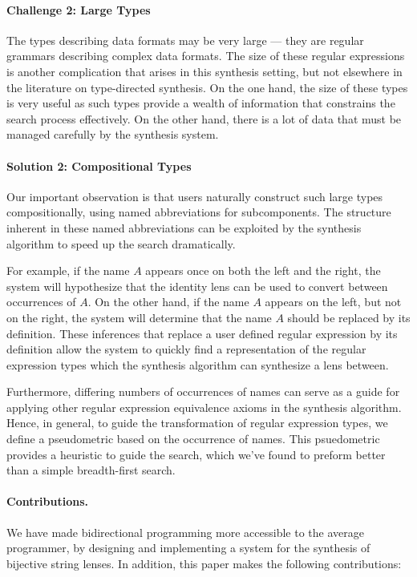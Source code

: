 \documentclass[numbers,10pt,preprint\ifanon ,nocopyrightspace\fi]{sigplanconf}
\begin{document}
\paragraph*{Challenge 2: Large Types}
The types
describing data formats may be very large --- they are regular
grammars describing complex data formats.  The size of these regular expressions
is another complication that
arises in this synthesis setting, but not elsewhere in the literature on
type-directed synthesis.  On the one hand, the size of these types is
very useful as such types provide a wealth of information that constrains
the search process effectively.  On the other hand, there is a lot of
data that must be managed carefully by the synthesis system.

\paragraph*{Solution 2: Compositional Types}
Our important observation is that users naturally construct such large types
compositionally, using named abbreviations for subcomponents.
The structure inherent in these named abbreviations can be
exploited by the synthesis algorithm to speed up the search dramatically.

For example, if the name $A$ appears once on both the left and the right,
the system will hypothesize that the identity lens can be used to convert
between occurrences of $A$.  On the other hand, if the name $A$ appears
on the left, but not on the right, the system will determine that the
name $A$ should be replaced by its definition.  These inferences that replace a
user defined regular expression by its definition allow the
system to quickly find a representation of the regular expression types which
the synthesis algorithm can synthesize a lens between.

Furthermore, differing
numbers of occurrences of names can serve as a guide for applying other regular
expression equivalence axioms in the synthesis algorithm.
Hence, in general, to guide the transformation of regular expression
types, we define a pseudometric based on the occurrence of names.  This
psuedometric provides a heuristic to guide the search, which we've found to
preform better than a simple breadth-first search.


\paragraph*{Contributions.}  We have made bidirectional programming more
accessible to the average programmer, by designing and implementing
a system for the synthesis of bijective string lenses.  In addition, this
paper makes the following contributions:
\end{document}
